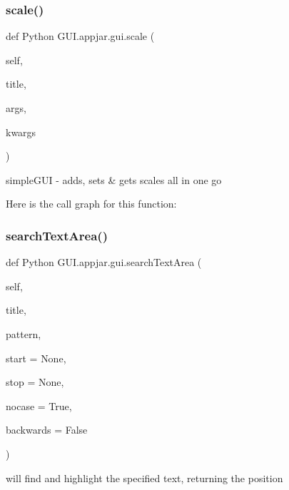 \begin{DoxyVerb}
\subsubsection{\texorpdfstring{scale()}{scale()}}
{\footnotesize\ttfamily def Python G\+U\+I.\+appjar.\+gui.\+scale (\begin{DoxyParamCaption}\item[{}]{self,  }\item[{}]{title,  }\item[{}]{args,  }\item[{}]{kwargs }\end{DoxyParamCaption})}

\begin{DoxyVerb}simpleGUI - adds, sets & gets scales all in one go \end{DoxyVerb}
 Here is the call graph for this function\+:
\mbox{\label{class_python_01_g_u_i_1_1appjar_1_1gui_adcbc770a81cc67dbac6f8f6f6980afa4}} 
\subsubsection{\texorpdfstring{search\+Text\+Area()}{searchTextArea()}}
{\footnotesize\ttfamily def Python G\+U\+I.\+appjar.\+gui.\+search\+Text\+Area (\begin{DoxyParamCaption}\item[{}]{self,  }\item[{}]{title,  }\item[{}]{pattern,  }\item[{}]{start = {\ttfamily None},  }\item[{}]{stop = {\ttfamily None},  }\item[{}]{nocase = {\ttfamily True},  }\item[{}]{backwards = {\ttfamily False} }\end{DoxyParamCaption})}

\begin{DoxyVerb}will find and highlight the specified text, returning the position \end{DoxyVerb}
 \mbox{\label{class_python_01_g_u_i_1_1appjar_1_1gui_ac2ffec41bdcd600a38e93bafdc369e55}} 

\end{DoxyVerb}
